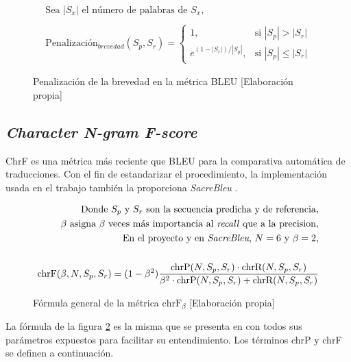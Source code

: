 \begin{figure}[H]
    \begin{align*}
        \text{Sea }|S_{x}|\text{ el número de palabras de }S_{x}\text{,}\\ \\
        \text{Penalización}_{brevedad}(S_{p}, S_{r}) =
        \begin{cases}
            1, &\text{si }|S_{p}| > |S_{r}|\\
            e^{(1 - |S_{r}|)/|S_{p}| }, &\text{si }|S_{p}|\leq{ |S_{r}| }
          \end{cases}
    \end{align*}
    \caption{Penalización de la brevedad en la métrica BLEU [Elaboración propia]}\label{Bleupenal}
\end{figure}


\subsection{\textit{Character N-gram F-score}}
ChrF \cite{popovic-2015-chrf} es una métrica más reciente que BLEU para la comparativa automática de traducciones. Con el fin de estandarizar el procedimiento, la implementación usada en el trabajo también la proporciona \textit{SacreBleu} \cite{Post2018Oct}.

\begin{figure}[H]
    \begin{align*}
        \text{Donde }S_p\text{ y }S_r\text{ son la secuencia predicha y de referencia,}\\
        \beta\text{ asigna }\beta\text{ veces más importancia al \textit{recall} que a la precision,}\\
        \text{En el proyecto y en \textit{SacreBleu}, }N=6\text{ y }\beta=2\text{,}\\ \\
        \text{chrF}(\beta, N,S_{p},S_{r})=(1-\beta^{2})\frac{\text{chrP}(N,S_{p},S_{r})\cdot\text{chrR}(N,S_{p},S_{r})}{\beta^{2}\cdot\text{chrP}(N,S_{p},S_{r})+\text{chrR}(N,S_{p},S_{r})}
    \end{align*}
    \caption{Fórmula general de la métrica $\text{chrF}_{\beta}$ [Elaboración propia]}\label{chrfformula}
\end{figure}

La fórmula de la figura \ref{chrfformula} es la misma que se presenta en \cite{popovic-2015-chrf} con todos sus parámetros expuestos para facilitar su entendimiento. Los términos chrP y chrF se definen a continuación.

